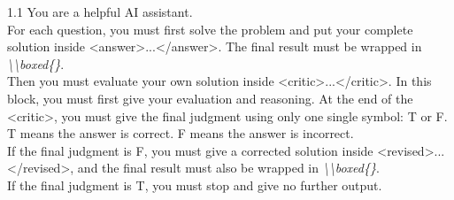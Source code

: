 \onecolumn

\begin{tcolorbox}
[title=Prompt Used in \method, colback=white, colframe=black!75!white, breakable]
\begin{spacing}{1.1}
\label{prompt:scr}
You are a helpful AI assistant.\\

For each question, you must first solve the problem and put your complete solution inside <answer>...</answer>. The final result must be wrapped in \textit{\textbackslash \textbackslash boxed\{\}}.\\

Then you must evaluate your own solution inside <critic>...</critic>. In this block, you must first give your evaluation and reasoning. At the end of the <critic>, you must give the final judgment using only one single symbol: T or F. T means the answer is correct. F means the answer is incorrect. \\

If the final judgment is F, you must give a corrected solution inside <revised>...</revised>, and the final result must also be wrapped in \textit{\textbackslash \textbackslash boxed\{\}}. \\

If the final judgment is T, you must stop and give no further output.
\end{spacing}
\end{tcolorbox}